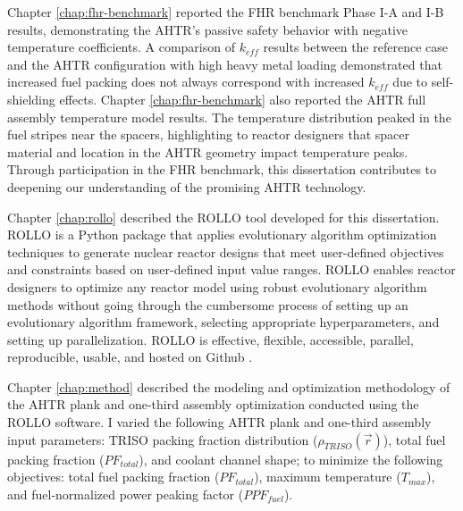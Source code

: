 Chapter \ref{chap:fhr-benchmark} reported the \gls{FHR} benchmark Phase I-A and I-B 
results, demonstrating the \gls{AHTR}'s passive safety behavior with 
negative temperature coefficients. 
A comparison of $k_{eff}$ results between the reference case and the \gls{AHTR} 
configuration with high heavy metal loading demonstrated that increased fuel 
packing does not always correspond with increased $k_{eff}$ due to self-shielding 
effects.
Chapter \ref{chap:fhr-benchmark} also reported the \gls{AHTR} full assembly temperature 
model results. 
The temperature distribution peaked in the fuel stripes near the spacers, 
highlighting to reactor designers that spacer material and location in the 
\gls{AHTR} geometry impact temperature peaks.  
Through participation in the \gls{FHR} benchmark, this dissertation contributes to 
deepening our understanding of the promising \gls{AHTR} technology. 

Chapter \ref{chap:rollo} described the \gls{ROLLO} tool developed for this 
dissertation. 
\gls{ROLLO} is a Python package that applies evolutionary algorithm 
optimization techniques to generate nuclear reactor designs that meet user-defined 
objectives and constraints based on user-defined input value ranges. 
\gls{ROLLO} enables reactor designers to optimize any reactor model using robust 
evolutionary algorithm methods without going through the cumbersome process of setting up 
an evolutionary algorithm framework, selecting appropriate hyperparameters, and 
setting up parallelization.
\gls{ROLLO} is effective, flexible, accessible, parallel, reproducible, usable, and 
hosted on Github \cite{chee_rollo_2021}. 

Chapter \ref{chap:method} described the modeling and optimization methodology of the 
\gls{AHTR} plank and one-third assembly optimization conducted using the \gls{ROLLO} 
software.
I varied the following \gls{AHTR} plank and one-third assembly input parameters: 
\gls{TRISO} packing fraction distribution ($\rho_{TRISO}(\vec{r})$), total fuel 
packing fraction ($PF_{total}$), and coolant channel shape; to minimize 
the following objectives: total fuel packing fraction ($PF_{total}$), maximum 
temperature ($T_{max}$), and fuel-normalized power peaking factor ($PPF_{fuel}$). 

